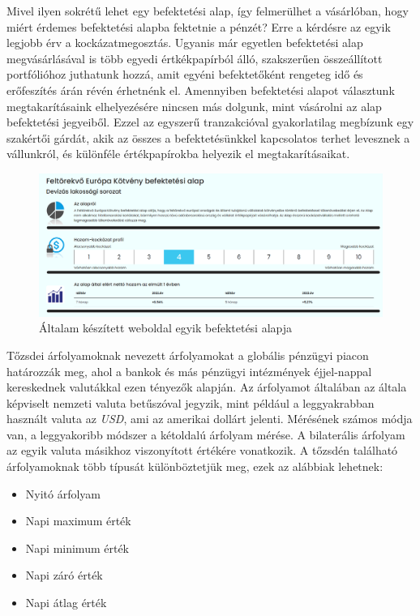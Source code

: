 	Mivel ilyen sokrétű lehet egy befektetési alap, így felmerülhet a vásárlóban, hogy miért érdemes befektetési alapba fektetnie a pénzét? Erre a kérdésre az egyik legjobb érv a kockázatmegosztás. Ugyanis már egyetlen befektetési alap megvásárlásával is több egyedi értkékpapírból álló, szakszerűen összeállított portfólióhoz juthatunk hozzá, amit egyéni befektetőként rengeteg idő és erőfeszítés árán révén érhetnénk el. Amennyiben befektetési alapot választunk megtakarításaink elhelyezésére nincsen más dolgunk, mint vásárolni az alap befektetési jegyeiből. Ezzel az egyszerű tranzakcióval gyakorlatilag megbízunk egy szakértői gárdát, akik az összes a befektetésünkkel kapcsolatos terhet levesznek a vállunkról, és különféle értékpapírokba helyezik el megtakarításaikat.

\begin{figure}[h]
\centering
\includegraphics[scale=0.3]{images/europeInvestExample}
\caption{Általam készített weboldal egyik befektetési alapja}
\end{figure}


Tőzsdei árfolyamoknak nevezett árfolyamokat a globális pénzügyi piacon határozzák meg, ahol a bankok és más pénzügyi intézmények éjjel-nappal kereskednek valutákkal ezen tényezők alapján. Az árfolyamot általában az általa képviselt nemzeti valuta betűszóval jegyzik, mint például a leggyakrabban használt valuta az \emph{USD}, ami az amerikai dollárt jelenti. Mérésének számos módja van, a  leggyakoribb módszer a kétoldalú árfolyam mérése. A bilaterális árfolyam az egyik valuta másikhoz viszonyított értékére vonatkozik. A tőzsdén található árfolyamoknak több típusát különböztetjük meg, ezek az alábbiak lehetnek: 
\begin{itemize}
\item Nyitó árfolyam
\item Napi maximum érték
\item Napi minimum érték
\item Napi záró érték
\item Napi átlag érték \cite{exchangeRate}
\end{itemize}

